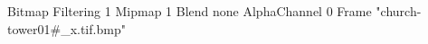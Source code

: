 {Bitmap
	{Filtering 1}
	{Mipmap 1}
	{Blend none}
	{AlphaChannel 0}
	{Frame "church-tower01#_x.tif.bmp"}
}
